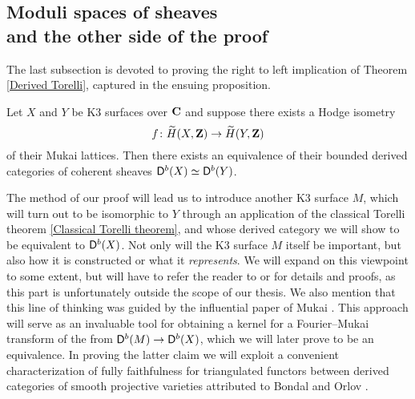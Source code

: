 \subsection[Moduli spaces of sheaves and the other side of the proof]{\texorpdfstring{Moduli spaces of sheaves \\ and the other side of the proof}{Moduli spaces of sheaves and the other side of the proof}
}

The last subsection is devoted to proving the right to left implication of Theorem \ref{Derived Torelli}, captured in the ensuing proposition.

\begin{proposition}
    \label{Hodge isometry implies D equivalence}
    Let $X$ and $Y$ be K3 surfaces over $\mathbf C$ and suppose there exists a Hodge isometry 
    \[
        f \colon \widetilde{H}(X, \mathbf Z) \to \widetilde{H}(Y, \mathbf Z)
    \]
    of their Mukai lattices. Then there exists an equivalence of their bounded derived categories of coherent sheaves $\mathsf{D}^b(X) \simeq \mathsf{D}^b(Y)$.
\end{proposition}
The method of our proof will lead us to introduce another K3 surface $M$, which will turn out to be isomorphic to $Y$ through an application of the classical Torelli theorem \ref{Classical Torelli theorem}, and whose derived category we will show to be equivalent to $\mathsf{D}^b(X)$. Not only will the K3 surface $M$ itself be important, but also how it is constructed or what it \emph{represents}. We will expand on this viewpoint to some extent, but will have to refer the reader to \cite{HuybrechtsLehn2010} or \cite{vanBree2020} for details and proofs, as this part is unfortunately outside the scope of our thesis. We also mention that this line of thinking was guided by the influential paper of Mukai \cite{Mukai1987}. This approach will serve as an invaluable tool for obtaining a kernel for a Fourier--Mukai transform of the from $\mathsf{D}^b(M) \to \mathsf{D}^b(X)$, which we will later prove to be an equivalence. 
In proving the latter claim we will exploit a convenient characterization of fully faithfulness for triangulated functors between derived categories of smooth projective varieties attributed to Bondal and Orlov \cite{BondalOrlov1995}.  
